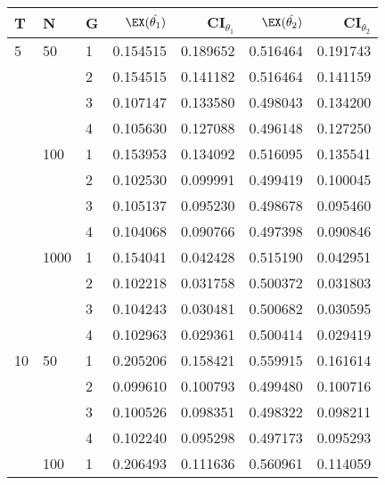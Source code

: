 \begin{tabular}{lllrrrr}
\toprule
T & N & G &  $\EX(\hat{\theta_1})$   &   CI$_{\theta_1}$           &   $\EX(\hat{\theta_2})$ & CI$_{\theta_2}$         \\
\midrule
5  & 50   & 1 &        0.154515 &           0.189652 &       0.516464 &           0.191743 \\
   &      & 2 &        0.154515 &           0.141182 &       0.516464 &           0.141159 \\
   &      & 3 &        0.107147 &           0.133580 &       0.498043 &           0.134200 \\
   &      & 4 &        0.105630 &           0.127088 &       0.496148 &           0.127250 \\
   & 100  & 1 &        0.153953 &           0.134092 &       0.516095 &           0.135541 \\
   &      & 2 &        0.102530 &           0.099991 &       0.499419 &           0.100045 \\
   &      & 3 &        0.105137 &           0.095230 &       0.498678 &           0.095460 \\
   &      & 4 &        0.104068 &           0.090766 &       0.497398 &           0.090846 \\
   & 1000 & 1 &        0.154041 &           0.042428 &       0.515190 &           0.042951 \\
   &      & 2 &        0.102218 &           0.031758 &       0.500372 &           0.031803 \\
   &      & 3 &        0.104243 &           0.030481 &       0.500682 &           0.030595 \\
   &      & 4 &        0.102963 &           0.029361 &       0.500414 &           0.029419 \\
10 & 50   & 1 &        0.205206 &           0.158421 &       0.559915 &           0.161614 \\
   &      & 2 &        0.099610 &           0.100793 &       0.499480 &           0.100716 \\
   &      & 3 &        0.100526 &           0.098351 &       0.498322 &           0.098211 \\
   &      & 4 &        0.102240 &           0.095298 &       0.497173 &           0.095293 \\
   & 100  & 1 &        0.206493 &           0.111636 &       0.560961 &           0.114059 \\

\end{tabular}
